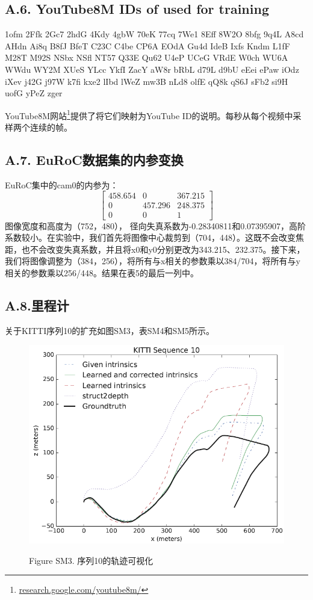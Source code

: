 \documentclass[10pt,journal,compsoc,UTF8]{IEEEtran}
\begin{document}
\subsection*{A.6. YouTube8M IDs of used for training}
1ofm 2Ffk 2Gc7 2hdG 4Kdy 4gbW 70eK 77cq 7We1 8Eff 8W2O 8bfg 9q4L A8cd AHdn Ai8q B8fJ BfeT C23C C4be CP6A EOdA Gu4d IdeB Ixfs Kndm L1fF M28T M92S NSbx NSfl NT57 Q33E Qu62 U4eP UCeG VRdE W0ch WU6A WWdu WY2M XUeS YLcc YkfI ZacY aW8r bRbL d79L d9bU eEei ePaw iOdz iXev j42G j97W k7fi kxe2 lIbd lWeZ mw3B nLd8 olfE qQ8k qS6J sFb2 si9H uofG yPeZ zger

YouTube8M网站\footnote{\url{research.google.com/youtube8m/}}提供了将它们映射为YouTube ID的说明。每秒从每个视频中采样两个连续的帧。

\subsection*{A.7. EuRoC数据集的内参变换}
EuRoC集中的cam0的内参为：
\begin{equation*}
  \begin{bmatrix}
    458.654&0&367.215\\
    0&457.296&248.375\\
    0&0&1
  \end{bmatrix}
\end{equation*}
图像宽度和高度为（752，480）， 径向失真系数为-0.28340811和0.07395907，高阶系数较小。在实验中，我们首先将图像中心裁剪到（704，448）。这既不会改变焦距，也不会改变失真系数，并且将x0和y0分别更改为343.215、232.375。接下来，我们将图像调整为（384，256），将所有与x相关的参数乘以384/704，将所有与y相关的参数乘以256/448。结果在表5的最后一列中。

\subsection*{A.8.里程计}
关于KITTI序列10的扩充如图SM3，表SM4和SM5所示。
\begin{figure}[htbp]
  \centering
    \includegraphics[width=0.9\linewidth]{imgs/SM3.png}\\
  \caption*{Figure SM3. 序列10的轨迹可视化}
  
\end{figure}
\end{document}
